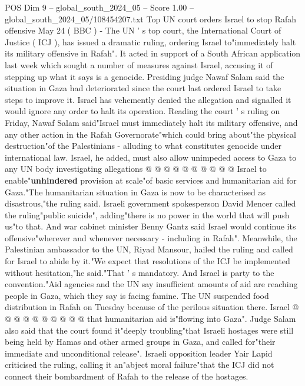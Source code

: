 \begin{textsample}{POS Dim 9 – global\_south\_2024\_05 – Score 1.00 – global\_south\_2024\_05/108454207.txt}  \label{ex:f9_pos_129}
Top UN court orders Israel to stop Rafah offensive May 24 ( BBC ) - The UN ' s top court, the International Court of Justice ( ICJ ), has issued a dramatic ruling, ordering Israel to"immediately halt its military offensive in Rafah".
It acted in support of a South African application last week which sought a number of measures against Israel, accusing it of stepping up what it says is a genocide.
Presiding judge Nawaf Salam said the situation in Gaza had deteriorated since the court last ordered Israel to take steps to improve it.
Israel has vehemently denied the allegation and signalled it would ignore any order to halt its operation.
Reading the court ' s ruling on Friday, Nawaf Salam said"Israel must immediately halt its military offensive, and any other action in the Rafah Governorate"which could bring about"the physical destruction"of the Palestinians - alluding to what constitutes genocide under international law.
Israel, he added, must also allow unimpeded access to Gaza to any UN body investigating allegations @ @ @ @ @ @ @ @ @ @ Israel to enable"\textbf{unhindered} provision at scale"of basic services and humanitarian aid for Gaza."The humanitarian situation in Gaza is now to be characterised as disastrous,"the ruling said.
Israeli government spokesperson David Mencer called the ruling"public suicide", adding"there is no power in the world that will push us"to that.
And war cabinet minister Benny Gantz said Israel would continue its offensive"wherever and whenever necessary - including in Rafah".
Meanwhile, the Palestinian ambassador to the UN, Riyad Mansour, hailed the ruling and called for Israel to abide by it."We expect that resolutions of the ICJ be implemented without hesitation,"he said."That ' s mandatory.
And Israel is party to the convention."Aid agencies and the UN say insufficient amounts of aid are reaching people in Gaza, which they say is facing famine.
The UN suspended food distribution in Rafah on Tuesday because of the perilous situation there.
Israel @ @ @ @ @ @ @ @ @ @ that humanitarian aid is"flowing into Gaza".
Judge Salam also said that the court found it"deeply troubling"that Israeli hostages were still being held by Hamas and other armed groups in Gaza, and called for"their immediate and unconditional release".
Israeli opposition leader Yair Lapid criticised the ruling, calling it an"abject moral failure"that the ICJ did not connect their bombardment of Rafah to the release of the hostages.

\end{textsample}
